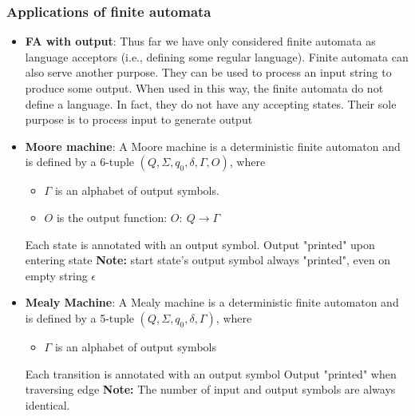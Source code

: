 \documentclass{report}
\begin{document}
    \pagebreak 
    \subsubsection{Applications of finite automata}
    \begin{itemize}
        \item \textbf{FA with output}:
            Thus far we have only considered finite automata as language acceptors (i.e., defining some regular language).
            \bigbreak \noindent 
            Finite automata can also serve another purpose. They can be used to process an input string to produce some output.
            \bigbreak \noindent 
            When used in this way, the finite automata do not define a language. In fact, they do not have any accepting states.
            \bigbreak \noindent 
            Their sole purpose is to process input to generate output
        \item \textbf{Moore machine}: A Moore machine is a deterministic finite automaton and is
            defined by a 6-tuple $(Q, \Sigma, q_{0}, \delta, \Gamma, O)$, where
            \begin{itemize}
                \item $\Gamma$ is an alphabet of output symbols.
                \item $O$ is the output function: $O:\ Q \to \Gamma$
            \end{itemize}
            \bigbreak \noindent 
            Each state is annotated with an output symbol. Output "printed" upon entering state
            \bigbreak \noindent 
            \textbf{Note:} start state's output symbol always "printed", even on empty string $\epsilon$
        \item \textbf{Mealy Machine}: A Mealy machine is a deterministic finite automaton and is defined by a 5-tuple $(Q, \Sigma, q_{0}, \delta, \Gamma)$, where 
            \begin{itemize}
                \item $\Gamma$ is an alphabet of output symbols
            \end{itemize}
            \bigbreak \noindent 
            Each transition is annotated with an output symbol Output "printed" when traversing edge
            \bigbreak \noindent 
            \textbf{Note:} The number of input and output symbols are always identical.
            \bigbreak \noindent 

    \end{itemize}
\end{document}
